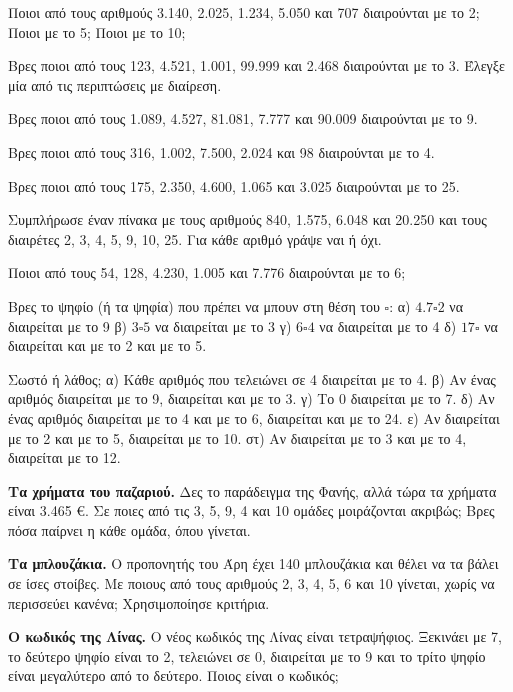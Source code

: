 

\ex Ποιοι από τους αριθμούς 3.140, 2.025, 1.234, 5.050 και 707 διαιρούνται με το 2; Ποιοι με το 5; Ποιοι με το 10;

\ex Βρες ποιοι από τους 123, 4.521, 1.001, 99.999 και 2.468 διαιρούνται με το 3. Έλεγξε μία από τις περιπτώσεις με διαίρεση.

\ex Βρες ποιοι από τους 1.089, 4.527, 81.081, 7.777 και 90.009 διαιρούνται με το 9.

\ex Βρες ποιοι από τους 316, 1.002, 7.500, 2.024 και 98 διαιρούνται με το 4.

\ex Βρες ποιοι από τους 175, 2.350, 4.600, 1.065 και 3.025 διαιρούνται με το 25.

\ex Συμπλήρωσε έναν πίνακα με τους αριθμούς 840, 1.575, 6.048 και 20.250 και τους διαιρέτες 2, 3, 4, 5, 9, 10, 25. Για κάθε αριθμό γράψε ναι ή όχι.

\ex Ποιοι από τους 54, 128, 4.230, 1.005 και 7.776 διαιρούνται με το 6;

\ex Βρες το ψηφίο (ή τα ψηφία) που πρέπει να μπουν στη θέση του $\square$: α) $4.7\square 2$ να διαιρείται με το 9 \quad β) $3\square 5$ να διαιρείται με το 3 \quad γ) $6\square 4$ να διαιρείται με το 4 \quad δ) $17\square$ να διαιρείται και με το 2 και με το 5.

\ex Σωστό ή λάθος; α) Κάθε αριθμός που τελειώνει σε 4 διαιρείται με το 4. \quad β) Αν ένας αριθμός διαιρείται με το 9, διαιρείται και με το 3. \quad γ) Το 0 διαιρείται με το 7. \quad δ) Αν ένας αριθμός διαιρείται με το 4 και με το 6, διαιρείται και με το 24. \quad ε) Αν διαιρείται με το 2 και με το 5, διαιρείται με το 10. \quad στ) Αν διαιρείται με το 3 και με το 4, διαιρείται με το 12.


\ex \textbf{Τα χρήματα του παζαριού.} Δες το παράδειγμα της Φανής, αλλά τώρα τα χρήματα είναι 3.465 €. Σε ποιες από τις 3, 5, 9, 4 και 10 ομάδες μοιράζονται ακριβώς; Βρες πόσα παίρνει η κάθε ομάδα, όπου γίνεται.

\ex \textbf{Τα μπλουζάκια.} Ο προπονητής του Άρη έχει 140 μπλουζάκια και θέλει να τα βάλει σε ίσες στοίβες. Με ποιους από τους αριθμούς 2, 3, 4, 5, 6 και 10 γίνεται, χωρίς να περισσεύει κανένα; Χρησιμοποίησε κριτήρια.

\ex \textbf{Ο κωδικός της Λίνας.} Ο νέος κωδικός της Λίνας είναι τετραψήφιος. Ξεκινάει με 7, το δεύτερο ψηφίο είναι το 2, τελειώνει σε 0, διαιρείται με το 9 και το τρίτο ψηφίο είναι μεγαλύτερο από το δεύτερο. Ποιος είναι ο κωδικός;

